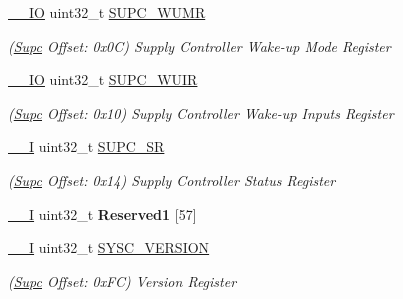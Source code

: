 \begin{DoxyCompactItemize}
\mbox{\label{structSupc_add26479862dd8e4bedc001624fd824ac}} 
\mbox{\hyperlink{core__cm7_8h_aec43007d9998a0a0e01faede4133d6be}{\+\_\+\+\_\+\+IO}} uint32\+\_\+t \mbox{\hyperlink{structSupc_add26479862dd8e4bedc001624fd824ac}{S\+U\+P\+C\+\_\+\+W\+U\+MR}}
\begin{DoxyCompactList}\small\item\em (\mbox{\hyperlink{structSupc}{Supc}} Offset\+: 0x0C) Supply Controller Wake-\/up Mode Register \end{DoxyCompactList}\item 
\mbox{\label{structSupc_a4f8141ee276011468c258e4eedc83a44}} 
\mbox{\hyperlink{core__cm7_8h_aec43007d9998a0a0e01faede4133d6be}{\+\_\+\+\_\+\+IO}} uint32\+\_\+t \mbox{\hyperlink{structSupc_a4f8141ee276011468c258e4eedc83a44}{S\+U\+P\+C\+\_\+\+W\+U\+IR}}
\begin{DoxyCompactList}\small\item\em (\mbox{\hyperlink{structSupc}{Supc}} Offset\+: 0x10) Supply Controller Wake-\/up Inputs Register \end{DoxyCompactList}\item 
\mbox{\label{structSupc_ad24fb50340b7cc990ccd09f33f3ed124}} 
\mbox{\hyperlink{core__cm7_8h_af63697ed9952cc71e1225efe205f6cd3}{\+\_\+\+\_\+I}} uint32\+\_\+t \mbox{\hyperlink{structSupc_ad24fb50340b7cc990ccd09f33f3ed124}{S\+U\+P\+C\+\_\+\+SR}}
\begin{DoxyCompactList}\small\item\em (\mbox{\hyperlink{structSupc}{Supc}} Offset\+: 0x14) Supply Controller Status Register \end{DoxyCompactList}\item 
\mbox{\label{structSupc_a721522326adca0f189db47edca2bc9c0}} 
\mbox{\hyperlink{core__cm7_8h_af63697ed9952cc71e1225efe205f6cd3}{\+\_\+\+\_\+I}} uint32\+\_\+t {\bfseries Reserved1} \mbox{[}57\mbox{]}
\item 
\mbox{\label{structSupc_a799818c9547ac12cddf338c269044602}} 
\mbox{\hyperlink{core__cm7_8h_af63697ed9952cc71e1225efe205f6cd3}{\+\_\+\+\_\+I}} uint32\+\_\+t \mbox{\hyperlink{structSupc_a799818c9547ac12cddf338c269044602}{S\+Y\+S\+C\+\_\+\+V\+E\+R\+S\+I\+ON}}
\begin{DoxyCompactList}\small\item\em (\mbox{\hyperlink{structSupc}{Supc}} Offset\+: 0x\+FC) Version Register \end{DoxyCompactList}\end{DoxyCompactItemize}


